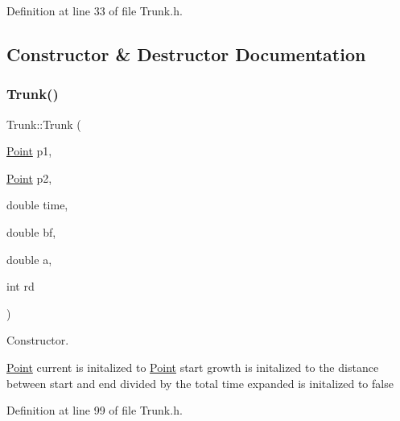 Definition at line 33 of file Trunk.\+h.



\subsection{Constructor \& Destructor Documentation}
\mbox{\label{class_trunk_a01d439d00e7e118af0f6e33626e773d1}} 
\subsubsection{\texorpdfstring{Trunk()}{Trunk()}}
{\footnotesize\ttfamily Trunk\+::\+Trunk (\begin{DoxyParamCaption}\item[{\mbox{\hyperlink{struct_point}{Point}}}]{p1,  }\item[{\mbox{\hyperlink{struct_point}{Point}}}]{p2,  }\item[{double}]{time,  }\item[{double}]{bf,  }\item[{double}]{a,  }\item[{int}]{rd }\end{DoxyParamCaption})\hspace{0.3cm}{\ttfamily [inline]}}



Constructor. 

\mbox{\hyperlink{struct_point}{Point}} current is initalized to \mbox{\hyperlink{struct_point}{Point}} start growth is initalized to the distance between start and end divided by the total time expanded is initalized to false 

Definition at line 99 of file Trunk.\+h.


\begin{DoxyCode}{0}

\end{DoxyCode}


